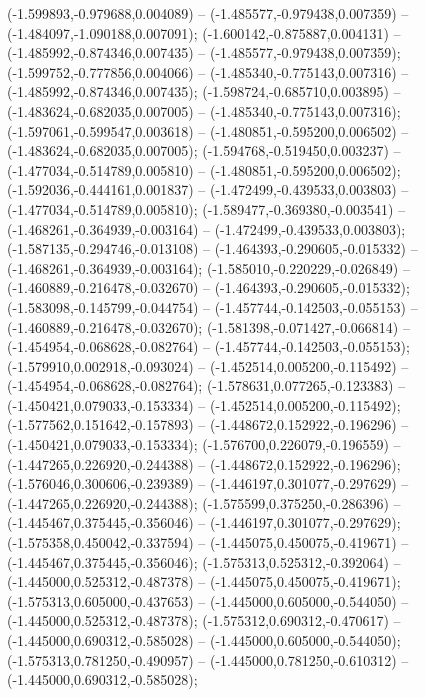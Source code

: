  (-1.599893,-0.979688,0.004089) -- (-1.485577,-0.979438,0.007359) -- (-1.484097,-1.090188,0.007091);
 (-1.600142,-0.875887,0.004131) -- (-1.485992,-0.874346,0.007435) -- (-1.485577,-0.979438,0.007359);
 (-1.599752,-0.777856,0.004066) -- (-1.485340,-0.775143,0.007316) -- (-1.485992,-0.874346,0.007435);
 (-1.598724,-0.685710,0.003895) -- (-1.483624,-0.682035,0.007005) -- (-1.485340,-0.775143,0.007316);
 (-1.597061,-0.599547,0.003618) -- (-1.480851,-0.595200,0.006502) -- (-1.483624,-0.682035,0.007005);
 (-1.594768,-0.519450,0.003237) -- (-1.477034,-0.514789,0.005810) -- (-1.480851,-0.595200,0.006502);
 (-1.592036,-0.444161,0.001837) -- (-1.472499,-0.439533,0.003803) -- (-1.477034,-0.514789,0.005810);
 (-1.589477,-0.369380,-0.003541) -- (-1.468261,-0.364939,-0.003164) -- (-1.472499,-0.439533,0.003803);
 (-1.587135,-0.294746,-0.013108) -- (-1.464393,-0.290605,-0.015332) -- (-1.468261,-0.364939,-0.003164);
 (-1.585010,-0.220229,-0.026849) -- (-1.460889,-0.216478,-0.032670) -- (-1.464393,-0.290605,-0.015332);
 (-1.583098,-0.145799,-0.044754) -- (-1.457744,-0.142503,-0.055153) -- (-1.460889,-0.216478,-0.032670);
 (-1.581398,-0.071427,-0.066814) -- (-1.454954,-0.068628,-0.082764) -- (-1.457744,-0.142503,-0.055153);
 (-1.579910,0.002918,-0.093024) -- (-1.452514,0.005200,-0.115492) -- (-1.454954,-0.068628,-0.082764);
 (-1.578631,0.077265,-0.123383) -- (-1.450421,0.079033,-0.153334) -- (-1.452514,0.005200,-0.115492);
 (-1.577562,0.151642,-0.157893) -- (-1.448672,0.152922,-0.196296) -- (-1.450421,0.079033,-0.153334);
 (-1.576700,0.226079,-0.196559) -- (-1.447265,0.226920,-0.244388) -- (-1.448672,0.152922,-0.196296);
 (-1.576046,0.300606,-0.239389) -- (-1.446197,0.301077,-0.297629) -- (-1.447265,0.226920,-0.244388);
 (-1.575599,0.375250,-0.286396) -- (-1.445467,0.375445,-0.356046) -- (-1.446197,0.301077,-0.297629);
 (-1.575358,0.450042,-0.337594) -- (-1.445075,0.450075,-0.419671) -- (-1.445467,0.375445,-0.356046);
 (-1.575313,0.525312,-0.392064) -- (-1.445000,0.525312,-0.487378) -- (-1.445075,0.450075,-0.419671);
 (-1.575313,0.605000,-0.437653) -- (-1.445000,0.605000,-0.544050) -- (-1.445000,0.525312,-0.487378);
 (-1.575312,0.690312,-0.470617) -- (-1.445000,0.690312,-0.585028) -- (-1.445000,0.605000,-0.544050);
 (-1.575313,0.781250,-0.490957) -- (-1.445000,0.781250,-0.610312) -- (-1.445000,0.690312,-0.585028);
